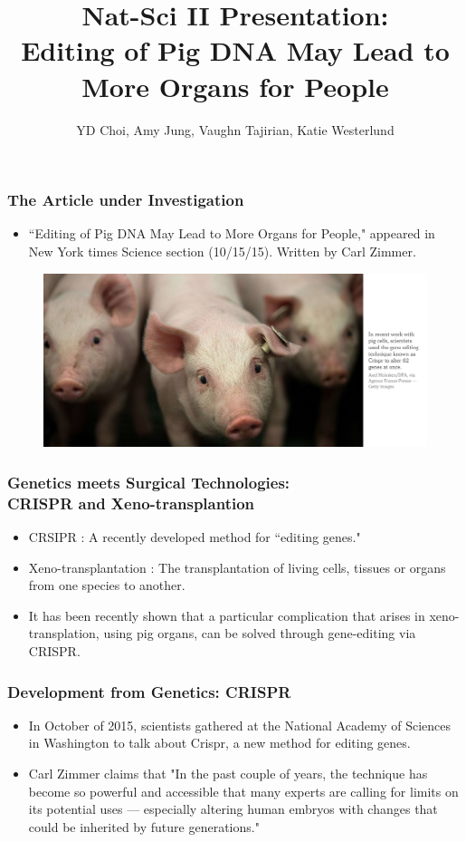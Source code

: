 \documentclass{beamer}
\title{Nat-Sci II Presentation: \\
Editing of Pig DNA May Lead to More Organs for People}
\author{YD Choi, Amy Jung, Vaughn Tajirian, Katie Westerlund }
\institute{New York University}
\begin{document}
 
\frame{\titlepage} 

\begin{frame}
\frametitle{The Article under Investigation}
\begin{itemize} 
\item ``Editing of Pig DNA May Lead to More Organs for People," appeared in
New York times Science section (10/15/15). Written by Carl Zimmer.
\end{itemize}
\begin{figure}[h!]
  \centering
    \includegraphics[width=1\textwidth]{edit-pigs.png}
\end{figure}
\end{frame}

\begin{frame}
\frametitle{Genetics meets Surgical Technologies: \\
CRISPR and Xeno-transplantion}
\begin{itemize}
\item CRSIPR : A recently developed method for 
``editing genes."
\item Xeno-transplantation :
The transplantation of living cells, tissues or organs
from one species to another. 
\item It has been recently shown that a particular
complication that arises in
xeno-transplation, using pig organs,
can be solved through gene-editing via CRISPR. 
\end{itemize}
\end{frame}

\begin{frame}
\frametitle{Development from Genetics: CRISPR}
\begin{itemize}
\item In October of 2015, scientists gathered at the National Academy of Sciences
in Washington to talk about Crispr, a new method for editing genes.

\item Carl Zimmer claims that "In the past couple of years, 
the technique has become so powerful and accessible that many experts are 
calling for limits on its potential uses — especially altering human 
embryos with changes that could be inherited by future generations."
\end{itemize}
\end{frame}
\end{document}
